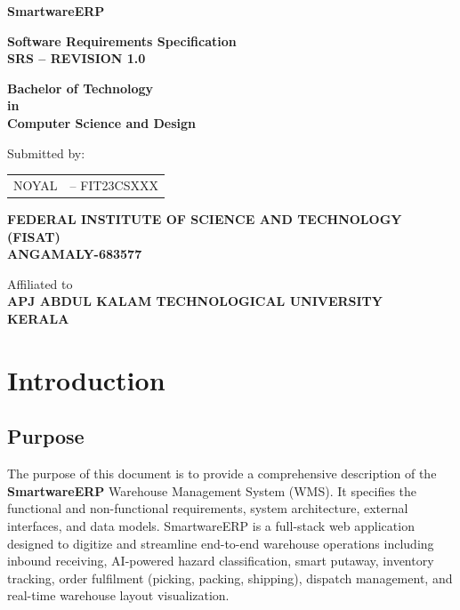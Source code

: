 \documentclass[12pt,a4paper]{report}
\begin{document}
\begin{titlepage}
    \centering
    \vspace*{1.5cm}
    
    \Huge
    \textbf{SmartwareERP}
    
    \vspace{0.8cm}
    \LARGE
    \textbf{Software Requirements Specification}\\
    \textbf{SRS -- REVISION 1.0}
    
    \vspace{2cm}
    
    \Large
    \textbf{Bachelor of Technology}\\
    \textbf{in}\\
    \textbf{Computer Science and Design}
    
    \vspace{2cm}
    
    \Large
    Submitted by:
    
    \vspace{0.5cm}
    \large
    \begin{tabular}{l c}
        NOYAL & -- FIT23CSXXX \\
    \end{tabular}
    
    \vfill
    
    \Large
    \textbf{FEDERAL INSTITUTE OF SCIENCE AND TECHNOLOGY (FISAT)}\\
    \normalsize
    \textbf{ANGAMALY-683577}
    
    \vspace{1.5cm}
    
    \large
    Affiliated to\\
    \textbf{APJ ABDUL KALAM TECHNOLOGICAL UNIVERSITY}\\
    \textbf{KERALA}
    
\end{titlepage}

\tableofcontents
\newpage

\chapter{Introduction}

\section{Purpose}
The purpose of this document is to provide a comprehensive description of the \textbf{SmartwareERP} Warehouse Management System (WMS). It specifies the functional and non-functional requirements, system architecture, external interfaces, and data models. SmartwareERP is a full-stack web application designed to digitize and streamline end-to-end warehouse operations including inbound receiving, AI-powered hazard classification, smart putaway, inventory tracking, order fulfilment (picking, packing, shipping), dispatch management, and real-time warehouse layout visualization.
\end{document}
